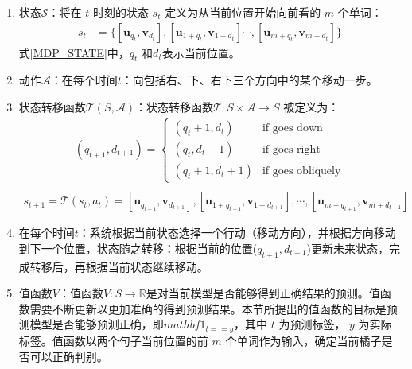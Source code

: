 \begin{enumerate}
	\item 状态$\mathcal{S}$：将在 $t$ 时刻的状态 $s_t$ 定义为从当前位置开始向前看的 $m$ 个单词：
	\begin{equation}\label{MDP_STATE}
	\begin{aligned}
		s_t &= \{[\mathbf{u}_{q_t}, \mathbf{v}_{d_t}], [\mathbf{u}_{1+q_t},\mathbf{v}_{1+d_t}] \cdots, [\mathbf{u}_{m+q_t}, \mathbf{v}_{m+d_t}]\}
	\end{aligned}
	\end{equation}
	式\eqref{MDP_STATE}中，$q_t$ 和$d_t$表示当前位置。
	\item 动作$\mathcal{A}$：在每个时间$t$：向包括右、下、右下三个方向中的某个移动一步。
	\item 状态转移函数$\mathcal{T}(S,\mathcal{A})$：状态转移函数$\mathcal{T}:S\times \mathcal{A}\rightarrow S$ 被定义为：
	\begin{equation}\label{MDP_STATE}
	\begin{aligned}
		(q_{t+1}, d_{t+1}) =
\begin{cases}
(q_{t} + 1, d_{t}) &\text{if goes down} \\
(q_{t}, d_{t} + 1) &\text{if goes right}  \\
(q_{t} + 1, d_{t} + 1) &\text{if goes obliquely}
\end{cases} \\
	\end{aligned}
	\end{equation}
	\begin{equation}\label{MDP_STATE}
	\begin{aligned}
		s_{t+1} = \mathcal{T}(s_t,a_t)=[\mathbf{u}_{q_{t+1}},\mathbf{v}_{d_{t+1}}],[\mathbf{u}_{1+q_{t+1}},\mathbf{v}_{1+d_{t+1}}],\cdots,[\mathbf{u}_{m+q_{t+1}},\mathbf{v}_{m+d_{t+1}}]
	\end{aligned}
	\end{equation}
	\item 在每个时间$t$：系统根据当前状态选择一个行动（移动方向），并根据方向移动到下一个位置，状态随之转移：根据当前的位置($q_{t+1},d_{t+1}$)更新未来状态，完成转移后，再根据当前状态继续移动。
	\item 值函数$V$：值函数$V: S\rightarrow \mathbb{R}$是对当前模型是否能够得到正确结果的预测。值函数需要不断更新以更加准确的得到预测结果。本节所提出的值函数的目标是预测模型是否能够预测正确，即$mathbf{1}_{t==y}$，其中 $t$ 为预测标签， $y$ 为实际标签。值函数以两个句子当前位置的前 $m$ 个单词作为输入，确定当前橘子是否可以正确判别。


\end{enumerate}
